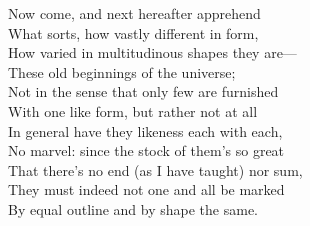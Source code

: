 Now come, and next hereafter apprehend\\
What sorts, how vastly different in form,\\
How varied in multitudinous shapes they are—\\
These old beginnings of the universe;\\
Not in the sense that only few are furnished\\
With one like form, but rather not at all\\
In general have they likeness each with each,\\
No marvel: since the stock of them's so great\\
That there's no end (as I have taught) nor sum,\\
They must indeed not one and all be marked\\
By equal outline and by shape the same.

